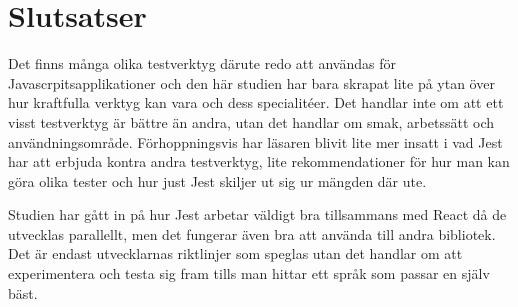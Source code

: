 \section{Slutsatser}
\label{sec:david-conclusion}
Det finns många olika testverktyg därute redo att användas för Javascrpitsapplikationer och den här studien har bara skrapat lite på ytan över hur kraftfulla verktyg kan vara och dess specialitéer. Det handlar inte om att ett visst testverktyg är bättre än andra, utan det handlar om smak, arbetssätt och användningsområde. Förhoppningsvis har läsaren blivit lite mer insatt i vad Jest har att erbjuda kontra andra testverktyg, lite rekommendationer för hur man kan göra olika tester och hur just Jest skiljer ut sig ur mängden där ute. 

Studien har gått in på hur Jest arbetar väldigt bra tillsammans med React då de utvecklas parallellt, men det fungerar även bra att använda till andra bibliotek. Det är endast utvecklarnas riktlinjer som speglas utan det handlar om att experimentera och testa sig fram tills man hittar ett språk som passar en själv bäst. 